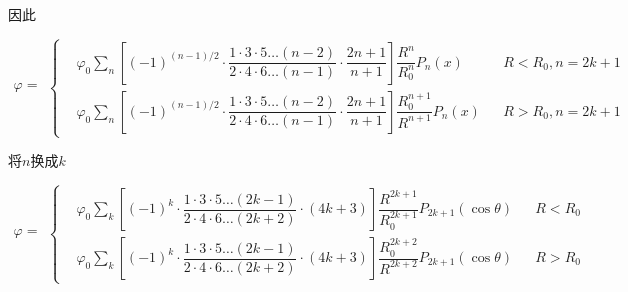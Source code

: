 \documentclass{article}
\begin{document}
因此

\begin{equation*}
  \begin{aligned}
    \varphi =
  \end{aligned}
  \left\{
  \begin{aligned}
    &\varphi_0 \sum_n \left[ \left( -1  \right)^{\left( n-1 \right)/ 2} \cdot \dfrac{1 \cdot 3 \cdot 5 \dots \left( n-2 \right)}{2 \cdot 4 \cdot 6 \dots \left( n-1 \right)} \cdot \dfrac{2n+1}{n+1} \right] \dfrac{R^n }{R_0^n} P_n \left( x \right) && R<R_0,n=2k+1 \\
    &\varphi_0 \sum_n \left[ \left( -1  \right)^{\left( n-1 \right)/ 2} \cdot \dfrac{1 \cdot 3 \cdot 5 \dots \left( n-2 \right)}{2 \cdot 4 \cdot 6 \dots \left( n-1 \right)} \cdot \dfrac{2n+1}{n+1} \right] \dfrac{R_0^{n+1} }{R^{n+1}} P_n \left( x \right) && R>R_0,n=2k+1
  \end{aligned}
  \right.
\end{equation*}

将$n$换成$k$

\begin{equation*}
  \begin{aligned}
    \varphi = 
  \end{aligned}
  \left\{
  \begin{aligned}
    &\varphi_0 \sum_k \left[ \left( -1  \right)^k \cdot \dfrac{1 \cdot 3 \cdot 5 \dots \left( 2k-1 \right)}{2 \cdot 4 \cdot 6 \dots \left( 2k+2 \right)} \cdot \left( 4k+3 \right)
 \right] \dfrac{R^{2k+1}}{R_0^{2k+1}}  P_{2k+1} \left( \cos \theta \right) && R<R_0\\
    &\varphi_0 \sum_k \left[ \left( -1  \right)^k \cdot \dfrac{1 \cdot 3 \cdot 5 \dots \left( 2k-1 \right)}{2 \cdot 4 \cdot 6 \dots \left( 2k+2 \right)} \cdot \left( 4k+3 \right)
 \right] \dfrac{R_0^{2k+2}}{R^{2k+2}}  P_{2k+1} \left( \cos \theta \right) && R>R_0
  \end{aligned}
  \right.
\end{equation*}
\end{document}
